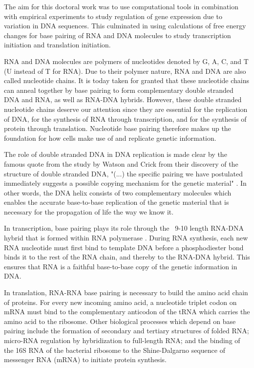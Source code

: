 %
The aim for this doctoral work was to use computational tools in combination
with empirical experiments to study regulation of gene expression due to
variation in DNA sequences. This culminated in using calculations of free
energy changes for base pairing of RNA and DNA molecules to study transcription
initiation and translation initiation.

RNA and DNA molecules are polymers of nucleotides denoted by G, A, C, and T (U
instead of T for RNA). Due to their polymer nature, RNA and DNA are also called
nucleotide chains. It is today taken for granted that these nucleotide chains
can anneal together by base pairing to form complementary double stranded DNA
and RNA, as well as RNA-DNA hybrids.  However, these double stranded nucleotide
chains deserve our attention since they are essential for the replication of
DNA, for the synthesis of RNA through transcription, and for the synthesis of
protein through translation.  Nucleotide base pairing therefore makes up the
foundation for how cells make use of and replicate genetic information.

The role of double stranded DNA in DNA replication is made clear by the famous
quote from the study by Watson and Crick from their discovery of the structure
of double stranded DNA, "(...) the specific pairing we have postulated
immediately suggests a possible copying mechanism for the genetic material"
\cite{watson_molecular_1953}. In other words, the DNA helix consists of two
complementary molecules which enables the accurate base-to-base replication of
the genetic material that is necessary for the propagation of life the way we
know it.

In transcription, base pairing plays its role through the ~9-10 length RNA-DNA
hybrid that is formed within RNA polymerase \cite{vassylyev_structural_2007}.
During RNA synthesis, each new RNA nucleotide must first bind to template DNA
before a phosphodiester bond binds it to the rest of the RNA chain, and thereby
to the RNA-DNA hybrid. This ensures that RNA is a faithful base-to-base copy of
the genetic information in DNA.

In translation, RNA-RNA base pairing is necessary to build the amino acid chain
of proteins. For every new incoming amino acid, a nucleotide triplet codon on
mRNA must bind to the complementary anticodon of the tRNA which carries the
amino acid to the ribosome. Other biological processes which depend on base
pairing include the formation of secondary and tertiary structures of folded
RNA; micro-RNA regulation by hybridization to full-length RNA; and the binding
of the 16S RNA of the bacterial ribosome to the Shine-Dalgarno sequence of
messenger RNA (mRNA) to initiate protein synthesis.

